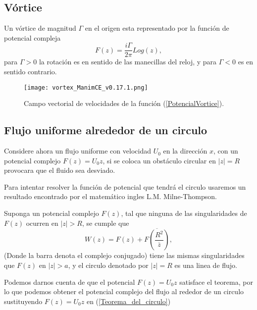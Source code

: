 \documentclass[12pt]{article}
\begin{document}
		\subsection{Vórtice}
			Un vórtice de magnitud $\Gamma $ en el origen esta representado por la función de potencial compleja
			\begin{equation}
				F(z)= \frac{i\Gamma}{2 \pi} Log(z),
				\label{PotencialVortice}	
			\end{equation}
			para $\Gamma>0$ la rotación es en sentido de las manecillas del reloj, y para $\Gamma<0$ es en sentido contrario.
			\begin{figure}[!h]
				\begin{small}
					\begin{center}
						\texttt{[image: vortex\_ManimCE\_v0.17.1.png]}
					\end{center}
					\caption{Campo vectorial de velocidades de la función (\ref{PotencialVortice}).}
				\end{small}
			\end{figure}
			

		\subsection{Flujo uniforme alrededor de un circulo }
		Considere ahora un flujo uniforme con velocidad $U_0$ en la dirección $x$, con un potencial complejo $F(z)= U_0 z$, si se coloca un obstáculo circular en $|z| =R$ provocara que el fluido sea desviado.
		
		\noindent Para intentar resolver la función de potencial que tendrá el circulo usaremos un resultado encontrado por el matemático ingles L.M. Milne-Thompson.
		
		\begin{theorem}
			Suponga un potencial complejo $F(z)$, tal que ninguna de las singularidades de $F(z)$ ocurren en $|z|>R$, se cumple que
			\begin{equation}
				W(z) = F(z) + \overline{F \left( \frac{R^2}{\overline{z} }\right)} ,
				\label{Teorema_del_circulo}
			\end{equation}
			(Donde la barra denota el complejo conjugado) tiene las mismas singularidades que $F(z)$ en $|z|>a $, y el circulo denotado por $|z|= R $ es una linea de flujo.
		\end{theorem}
		
		\noindent Podemos darnos cuenta de que el potencial $F(z)= U_0 z$ satisface el teorema, por lo que podemos obtener el potencial complejo  del flujo al rededor de un circulo sustituyendo $F(z)= U_0 z$ en (\ref*{Teorema_del_circulo}) 
\end{document}
